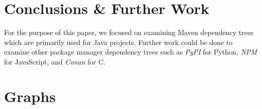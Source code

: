 \documentclass[10pt, compsoc, conference]{IEEEtran}
\begin{document}
\section{Conclusions \& Further Work}
For the purpose of this paper, we focused on examining Maven dependency trees which are primarily used for Java projects. Further work could be done to examine other package manager dependency trees such as \textit{PyPI} for Python, \textit{NPM} for JavaScript, and \textit{Conan} for C. 

\printbibliography

\appendices
\section{Graphs}

\ifCLASSOPTIONcaptionsoff
  \newpage
\fi
\end{document}
